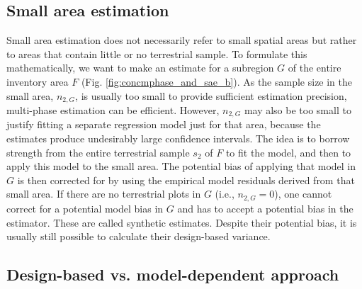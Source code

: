 \subsection{Small area estimation}

Small area estimation does not necessarily refer to small spatial areas but rather to areas that contain little or no terrestrial sample. To formulate this mathematically, we want to make an estimate for a subregion $G$ of the entire inventory area $F$ (Fig. \ref{fig:concmphase_and_sae_b}). As the sample size in the small area, $n_{2,G}$, is usually too small to provide sufficient estimation precision, multi-phase estimation can be efficient. However, $n_{2,G}$ may also be too small to justify fitting a separate regression model just for that area, because the estimates produce undesirably large confidence intervals. The idea is to borrow strength from the entire terrestrial sample $s_2$ of $F$ to fit the model, and then to apply this model to the small area. The potential bias of applying that model in $G$ is then corrected for by using the empirical model residuals derived from that small area. If there are no terrestrial plots in $G$ (i.e., $n_{2,G}=0$), one cannot correct for a potential model bias in $G$ and has to accept a potential bias in the estimator. These are called synthetic estimates. Despite their potential bias, it is usually still possible to calculate their design-based variance.


\subsection{Design-based vs. model-dependent approach}
\label{sec:db_vs_md}

